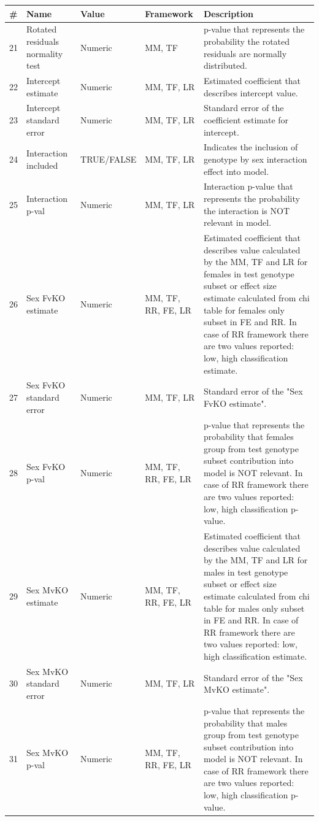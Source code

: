 \documentclass[12pt,a4paper]{article}
\begin{document}
\begin{table}
 \small
\begin{tabular}{| l | l | l | l | p{10cm} |}
  \hline
\#&Name&Value&Framework&Description\\\hline
21&Rotated residuals normality test&Numeric&MM, TF&p-value that represents the probability the rotated residuals are normally distributed.\\
22&Intercept estimate&Numeric&MM, TF, LR&Estimated coefficient that describes intercept value.\\
23&Intercept standard error&Numeric&MM, TF, LR&Standard error of the coefficient estimate for intercept.\\
24&Interaction included&TRUE/FALSE&MM, TF, LR&Indicates the inclusion of genotype by sex interaction effect into model.\\
25&Interaction p-val&Numeric&MM, TF, LR&Interaction p-value that represents the probability the interaction is NOT relevant in model.\\
26&Sex FvKO estimate&Numeric&MM, TF, RR, FE, LR&Estimated coefficient that describes value calculated by the MM, TF and LR for females in test genotype subset or effect size estimate calculated from chi table for females only subset in FE and RR. In case of RR framework there are two values reported: low, high classification estimate.\\
27&Sex FvKO standard error&Numeric&MM, TF, LR&Standard error of the "Sex FvKO estimate".\\
28&Sex FvKO p-val&Numeric&MM, TF, RR, FE, LR&p-value that represents the probability that females group from test genotype subset contribution into model is NOT relevant. In case of RR framework there are two values reported: low, high classification p-value.\\
29&Sex MvKO estimate&Numeric&MM, TF, RR, FE, LR&Estimated coefficient that describes value calculated by the MM, TF and LR for males in test genotype subset or effect size estimate calculated from chi table for males only subset in FE and RR. In case of RR framework there are two values reported: low, high classification estimate.\\
30&Sex MvKO standard error&Numeric&MM, TF, LR&Standard error of the "Sex MvKO estimate".\\
31&Sex MvKO p-val&Numeric&MM, TF, RR, FE, LR&p-value that represents the probability that males group from test genotype subset contribution into model is NOT relevant. In case of RR framework there are two values reported: low, high classification p-value.\\

\end{tabular}
\end{table}
\end{document}
